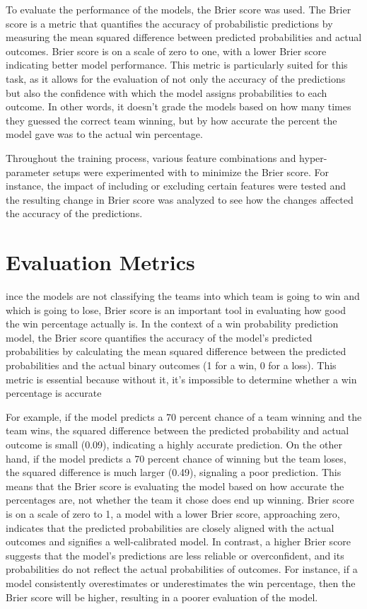 \documentclass[10pt,twocolumn]{article}
\begin{document}
To evaluate the performance of the models, the Brier score was used. The Brier score is a metric that quantifies the accuracy of probabilistic predictions by measuring the mean squared difference between predicted probabilities and actual outcomes. Brier score is on a scale of zero to one, with a lower Brier score indicating better model performance. This metric is particularly suited for this task, as it allows for the evaluation of not only the accuracy of the predictions but also the confidence with which the model assigns probabilities to each outcome. In other words, it doesn’t grade the models based on how many times they guessed the correct team winning, but by how accurate the percent the model gave was to the actual win percentage.

Throughout the training process, various feature combinations and hyper-parameter setups were experimented with to minimize the Brier score. For instance, the impact of including or excluding certain features were tested and the resulting change in Brier score was analyzed to see how the changes affected the accuracy of the predictions.




\section{Evaluation Metrics}

ince the models are not classifying the teams into which team is going to win and which is going to lose, Brier score is an important tool in evaluating how good the win percentage actually is. In the context of a win probability prediction model, the Brier score quantifies the accuracy of the model's predicted probabilities by calculating the mean squared difference between the predicted probabilities and the actual binary outcomes (1 for a win, 0 for a loss). This metric is essential because without it, it’s impossible to determine whether a win percentage is accurate

For example, if the model predicts a 70 percent chance of a team winning and the team wins, the squared difference between the predicted probability and actual outcome is small (0.09), indicating a highly accurate prediction. On the other hand, if the model predicts a 70 percent chance of winning but the team loses, the squared difference is much larger (0.49), signaling a poor prediction. This means that the Brier score is evaluating the model based on how accurate the percentages are, not whether the team it chose does end up winning.
Brier score is on a scale of zero to 1, a model with a lower Brier score, approaching zero, indicates that the predicted probabilities are closely aligned with the actual outcomes and signifies a well-calibrated model. In contrast, a higher Brier score suggests that the model’s predictions are less reliable or overconfident, and its probabilities do not reflect the actual probabilities of outcomes. For instance, if a model consistently overestimates or underestimates the win percentage, then the Brier score will be higher, resulting in a poorer evaluation of the model.
\end{document}
